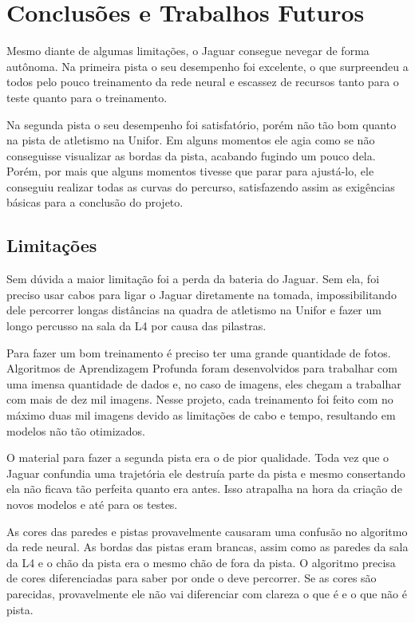 \chapter{Conclusões e Trabalhos Futuros}
\label{chap:conclusoes-e-trabalhos-futuros}

Mesmo diante de algumas limitações, o Jaguar consegue nevegar de forma autônoma. Na primeira pista o seu desempenho foi excelente, o que surpreendeu a todos pelo pouco treinamento da rede neural e escassez de recursos tanto para o teste quanto para o treinamento.

Na segunda pista o seu desempenho foi satisfatório, porém não tão bom quanto na pista de atletismo na Unifor. Em alguns momentos ele agia como se não conseguisse visualizar as bordas da pista, acabando fugindo um pouco dela. Porém, por mais que alguns momentos tivesse que parar para ajustá-lo, ele conseguiu realizar todas as curvas do percurso, satisfazendo assim as exigências básicas para a conclusão do projeto.

\section{Limitações}
\label{sec:limitacoes}

Sem dúvida a maior limitação foi a perda da bateria do Jaguar. Sem ela, foi preciso usar cabos para ligar o Jaguar diretamente na tomada, impossibilitando dele percorrer longas distâncias na quadra de atletismo na Unifor e fazer um longo percusso na sala da L4 por causa das pilastras.

Para fazer um bom treinamento é preciso ter uma grande quantidade de fotos. Algoritmos de Aprendizagem Profunda foram desenvolvidos para trabalhar com uma imensa quantidade de dados e, no caso de imagens, eles chegam a trabalhar com mais de dez mil imagens. Nesse projeto, cada treinamento foi feito com no máximo duas mil imagens devido as limitações de cabo e tempo, resultando em modelos não tão otimizados.

O material para fazer a segunda pista era o de pior qualidade. Toda vez que o Jaguar confundia uma trajetória ele destruía parte da pista e mesmo consertando ela não ficava tão perfeita quanto era antes. Isso atrapalha na hora da criação de novos modelos e até para os testes.

As cores das paredes e pistas provavelmente causaram uma confusão no algoritmo da rede neural. As bordas das pistas eram brancas, assim como as paredes da sala da L4 e o chão da pista era o mesmo chão de fora da pista. O algoritmo precisa de cores diferenciadas para saber por onde o deve percorrer. Se as cores são parecidas, provavelmente ele não vai diferenciar com clareza o que é e o que não é pista.

